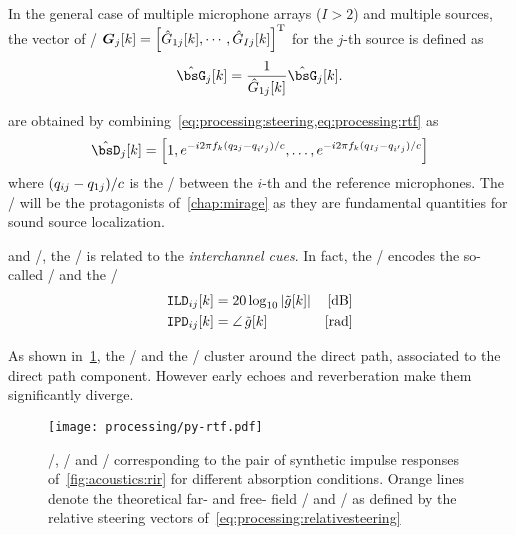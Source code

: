 In the general case of multiple microphone arrays ($I>2$) and multiple sources, the vector of \RTFs/
$\boldsymbol{G}_j[k] = \ktranspose{\klist{\hat{G}_ {1j}[k], \cdots, \hat{G}_{Ij}[k]}}$
for the $j$-th source is defined as
\begin{equation}
    \hat{\bsG}_j[k] = \frac{1}{\hat{G}_{1j}[k]} \hat{\bsG}_j[k]
    .
\end{equation}


 are obtained by combining~\cref{eq:processing:steering,eq:processing:rtf} as
\begin{equation}\label{eq:processing:relativesteering}
    \hat{\bsD}_{j}[k] = \klist{
                         1,
                         \cste^{-\csti 2 \pi f_k (\distMicSrc_{2j}-\distMicSrc_{i'j}) / \speedOfSound},
                         \ldots,
                         \cste^{-\csti 2 \pi f_k (\distMicSrc_{Ij}-\distMicSrc_{i'j}) / \speedOfSound}
                    }
\end{equation}
where $(q_{ij}-q_{1j}) / c$ is the \TDOA/ between the $i$-th and the reference microphones.
The \TDOAs/ will be the protagonists of~\cref{chap:mirage} as they are fundamental quantities for sound source localization.

 and \CASA/, the \RTF/ is related to the \textit{interchannel cues}.
In fact, the \RTFs/ encodes the so-called \ILD/ and the \IPD/
\begin{equation}
    \begin{aligned}
        \ild_{ij}[k] &= 20 \log_{10} \magnitudeOf{\rtf[k]} & [\si{\dB}]\\
        \ipd_{ij}[k] &= \phaseOf{\rtf[k]} \mathspace       & [\si{\radian}]
    \end{aligned}
\end{equation}

As shown in~\cref{fig:processing:ildipd}, the \ILD/ and the \IPD/ cluster around the direct path, associated to the direct path component.
However early echoes and reverberation make them significantly diverge.

\begin{figure}[b]
    \begin{fullwidthfig}
        \texttt{[image: processing/py-rtf.pdf]}
        \caption{
            \RIR/, \ILD/ and \IPD/ corresponding to the pair of synthetic impulse responses of~\cref{fig:acoustics:rir} for different absorption conditions.
            Orange lines denote the theoretical far- and free- field \ILD/ and \IPD/ as defined by the relative steering vectors of~\cref{eq:processing:relativesteering}
        }\label{fig:processing:ildipd}
    \end{fullwidthfig}

\end{figure}



